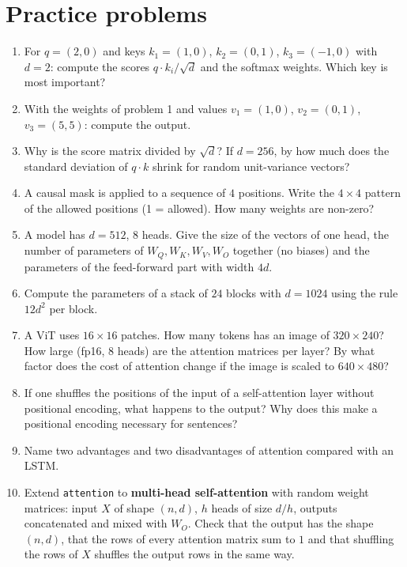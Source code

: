 \section*{Practice problems}
\begin{enumerate}[label=\textbf{\thechapter.\arabic*}]
  \item For $q=(2,0)$ and keys $k_1=(1,0)$, $k_2=(0,1)$, $k_3=(-1,0)$ with $d=2$: compute the scores $q\cdot k_i/\sqrt d$ and the softmax weights. Which key is most important?
  \item With the weights of problem 1 and values $v_1=(1,0)$, $v_2=(0,1)$, $v_3=(5,5)$: compute the output.
  \item Why is the score matrix divided by $\sqrt d$? If $d=256$, by how much does the standard deviation of $q\cdot k$ shrink for random unit-variance vectors?
  \item A causal mask is applied to a sequence of $4$ positions. Write the $4\times4$ pattern of the allowed positions (1 = allowed). How many weights are non-zero?
  \item A model has $d=512$, $8$ heads. Give the size of the vectors of one head, the number of parameters of $W_Q,W_K,W_V,W_O$ together (no biases) and the parameters of the feed-forward part with width $4d$.
  \item Compute the parameters of a stack of $24$ blocks with $d=1024$ using the rule $12d^2$ per block.
  \item A ViT uses $16\times16$ patches. How many tokens has an image of $320\times240$? How large (fp16, $8$ heads) are the attention matrices per layer? By what factor does the cost of attention change if the image is scaled to $640\times480$?
  \item If one shuffles the positions of the input of a self-attention layer without positional encoding, what happens to the output? Why does this make a positional encoding necessary for sentences?
  \item Name two advantages and two disadvantages of attention compared with an LSTM.
  \item[\textbf{\thechapter.10}$\star$] Extend \texttt{attention} to \textbf{multi-head self-attention} with random weight matrices: input $X$ of shape $(n,d)$, $h$ heads of size $d/h$, outputs concatenated and mixed with $W_O$. Check that the output has the shape $(n,d)$, that the rows of every attention matrix sum to $1$ and that shuffling the rows of $X$ shuffles the output rows in the same way.
\end{enumerate}
